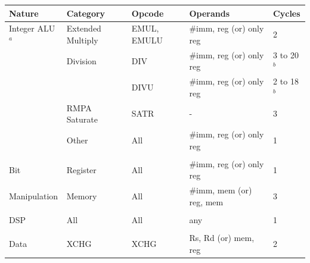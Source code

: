 \clearpage
\begin{table}
\begin{subtable}{\linewidth}
\begin{center}
\scriptsize
\setlength{\tabcolsep}{4pt}
\begin{tabular}{lllll}
\hline
Nature             & Category           & Opcode                                 & Operands                           & Cycles                   \\ \hline
Integer ALU$^a$    & Extended Multiply  & EMUL, EMULU                            & \#imm, reg (or) only reg           & 2                        \\
                   & Division           & DIV                                    & \#imm, reg (or) only reg           & 3 to 20$^b$              \\
                   &                    & DIVU                                   & \#imm, reg (or) only reg           & 2 to 18$^b$              \\
                   & RMPA Saturate      & SATR                                   & -                                  & 3                        \\
                   & Other              & All                                    & \#imm, reg (or) only reg           & 1                        \\
                   &                    &                                        &                                    &                          \\
Bit                & Register           & All                                    & \#imm, reg (or) only reg           & 1                        \\
Manipulation       & Memory             & All                                    & \#imm, mem (or) reg, mem           & 3                        \\
                   &                    &                                        &                                    &                          \\
DSP                & All                & All                                    & any                                & 1                        \\
                   &                    &                                        &                                    &                          \\
Data               & XCHG               & XCHG                                   & Rs, Rd (or) mem, reg               & 2                        \\

\end{tabular}
\end{center}
\end{subtable}
\end{table}
